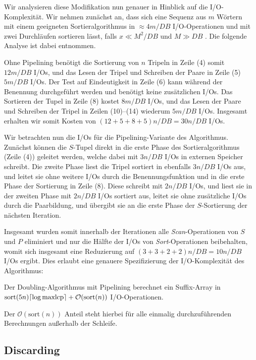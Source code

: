 Wir analysieren diese Modifikation nun genauer in Hinblick auf die I/O-Komplexität. Wir nehmen zunächst an, dass sich eine Sequenz aus $m$ Wörtern mit einem geeigneten Sortieralgorithmus in $\approx 4m/DB$ I/O-Operationen und mit zwei Durchläufen sortieren lässt, falls $x \ll M^2/DB$ und $M \gg DB$ \cite{Aggarwal1988}. Die folgende Analyse ist dabei \cite{saca:11} entnommen.

Ohne Pipelining benötigt die Sortierung von $n$ Tripeln in Zeile (4) somit $12m/DB$ I/Os, und das Lesen der Tripel und Schreiben der Paare in Zeile (5) $5m/DB$ I/Os. Der Test auf Eindeutigkeit in Zeile (6) kann während der Benennung durchgeführt werden und benötigt keine zusätzlichen I/Os. Das Sortieren der Tupel in Zeile (8) kostet $8m/DB$ I/Os, und das Lesen der Paare und Schreiben der Tripel in Zeilen (10)--(14) wiederum  $5m/DB$ I/Os. Insgesamt erhalten wir somit Kosten von $(12 + 5 + 8 +5)n/DB = 30n/DB$ I/Os.

Wir betrachten nun die I/Os für die Pipelining-Variante des Algorithmus. Zunächst können die $S$-Tupel direkt in die erste Phase des Sortieralgorithmus (Zeile (4)) geleitet werden, welche dabei mit $3n/DB$ I/Os in externen Speicher schreibt. Die zweite Phase liest die Tripel sortiert in ebenfalls $3n/DB$ I/Os aus, und leitet sie ohne weitere I/Os durch die Benennungsfunktion und in die erste Phase der Sortierung in Zeile (8). Diese schreibt mit $2n/DB$ I/Os, und liest sie in der zweiten Phase mit $2n/DB$ I/Os sortiert aus, leitet sie ohne zusätzliche I/Os durch die Paarbildung, und übergibt sie an die erste Phase der $S$-Sortierung der nächsten Iteration. 

Insgesamt wurden somit innerhalb der Iterationen alle \textit{Scan}-Operationen von $S$ und $P$ eliminiert und nur die Hälfte der I/Os von \textit{Sort}-Operationen beibehalten, womit sich insgesamt eine Reduzierung auf $(3 + 3 + 2 + 2)n/DB = 10n/DB$ I/Os ergibt. Dies erlaubt eine genauere Spezifizierung der I/O-Komplexität des Algorithmus:

\begin{theorem}
Der Doubling-Algorithmus mit Pipelining berechnet ein Suffix-Array in $\text{sort}(5n) \ceil*{\log \text{maxlcp}} +  \mathcal{O}(\text{sort}(n))$ I/O-Operationen.
\end{theorem}

Der $\mathcal{O}(\text{sort}(n))$ Anteil steht hierbei für alle einmalig durchzuführenden Berechnungen außerhalb der Schleife.

\subsection{Discarding}
\label{algo:doubling:sec:discarding}

